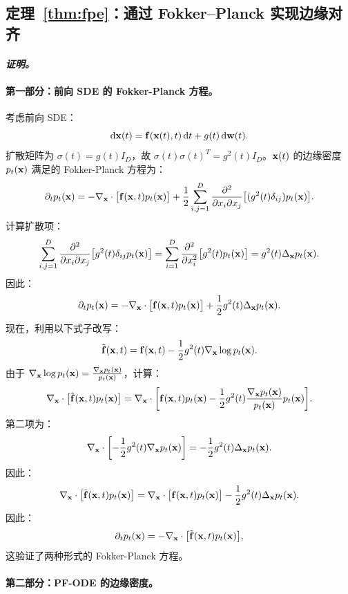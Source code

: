 \subsection{定理~\ref{thm:fpe}：通过 Fokker–Planck 实现边缘对齐}\label{app-sec:scoresde-fpe-proof}

\paragraph{\textit{证明。}}
\paragraph{第一部分：前向 SDE 的 Fokker-Planck 方程。}

考虑前向 SDE：
\[
\mathop{}\!\mathrm{d} {\mathbf{x}}(t) = {\mathbf{f}}({\mathbf{x}}(t), t)  \mathop{}\!\mathrm{d} t + g(t)  \mathop{}\!\mathrm{d} {\mathbf{w}}(t).
\]
扩散矩阵为 $\sigma(t) = g(t) I_D$，故 $\sigma(t) \sigma(t)^T = g^2(t) I_D$。${\mathbf{x}}(t)$ 的边缘密度 $p_t({\mathbf{x}})$ 满足的 Fokker-Planck 方程为：
\[
\partial_t p_t({\mathbf{x}}) = -\nabla_{{\mathbf{x}}} \cdot \bigl[ {\mathbf{f}}({\mathbf{x}}, t) p_t({\mathbf{x}}) \bigr] + \frac{1}{2} \sum_{i,j=1}^D \frac{\partial^2}{\partial x_i \partial x_j} \bigl[ (g^2(t) \delta_{ij}) p_t({\mathbf{x}}) \bigr].
\]
计算扩散项：
\[
\sum_{i,j=1}^D \frac{\partial^2}{\partial x_i \partial x_j} \bigl[ g^2(t) \delta_{ij} p_t({\mathbf{x}}) \bigr] = \sum_{i=1}^D \frac{\partial^2}{\partial x_i^2} \bigl[ g^2(t) p_t({\mathbf{x}}) \bigr] = g^2(t) \Delta_{{\mathbf{x}}} p_t({\mathbf{x}}).
\]
因此：
\[
\partial_t p_t({\mathbf{x}}) = -\nabla_{{\mathbf{x}}} \cdot \bigl[ {\mathbf{f}}({\mathbf{x}}, t) p_t({\mathbf{x}}) \bigr] + \frac{1}{2} g^2(t) \Delta_{{\mathbf{x}}} p_t({\mathbf{x}}).
\]
现在，利用以下式子改写：
\[
\tilde {{\mathbf{f}}}({\mathbf{x}}, t) = {\mathbf{f}}({\mathbf{x}}, t) - \frac{1}{2} g^2(t) \nabla_{{\mathbf{x}}} \log p_t({\mathbf{x}}).
\]
由于 $\nabla_{{\mathbf{x}}} \log p_t({\mathbf{x}}) = \frac{\nabla_{{\mathbf{x}}} p_t({\mathbf{x}})}{p_t({\mathbf{x}})}$，计算：
\[
\nabla_{{\mathbf{x}}} \cdot \bigl[ \tilde {{\mathbf{f}}}({\mathbf{x}}, t) p_t({\mathbf{x}}) \bigr] = \nabla_{{\mathbf{x}}} \cdot \biggl[ {\mathbf{f}}({\mathbf{x}}, t) p_t({\mathbf{x}}) - \frac{1}{2} g^2(t) \frac{\nabla_{{\mathbf{x}}} p_t({\mathbf{x}})}{p_t({\mathbf{x}})} p_t({\mathbf{x}}) \biggr].
\]
第二项为：
\[
\nabla_{{\mathbf{x}}} \cdot \biggl[ -\frac{1}{2} g^2(t) \nabla_{{\mathbf{x}}} p_t({\mathbf{x}}) \biggr] = -\frac{1}{2} g^2(t) \Delta_{{\mathbf{x}}} p_t({\mathbf{x}}).
\]
因此：
\[
\nabla_{{\mathbf{x}}} \cdot \bigl[ \tilde {{\mathbf{f}}}({\mathbf{x}}, t) p_t({\mathbf{x}}) \bigr] = \nabla_{{\mathbf{x}}} \cdot \bigl[ {\mathbf{f}}({\mathbf{x}}, t) p_t({\mathbf{x}}) \bigr] - \frac{1}{2} g^2(t) \Delta_{{\mathbf{x}}} p_t({\mathbf{x}}).
\]
因此：
\[
\partial_t p_t({\mathbf{x}}) = -\nabla_{{\mathbf{x}}} \cdot \bigl[ \tilde {{\mathbf{f}}}({\mathbf{x}}, t) p_t({\mathbf{x}}) \bigr],
\]
这验证了两种形式的 Fokker-Planck 方程。

\paragraph{第二部分：PF-ODE 的边缘密度。}

